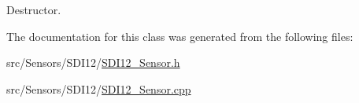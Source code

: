 Destructor. 



The documentation for this class was generated from the following files\+:\begin{DoxyCompactItemize}
\item 
src/\+Sensors/\+S\+D\+I12/\hyperlink{_s_d_i12___sensor_8h}{S\+D\+I12\+\_\+\+Sensor.\+h}\item 
src/\+Sensors/\+S\+D\+I12/\hyperlink{_s_d_i12___sensor_8cpp}{S\+D\+I12\+\_\+\+Sensor.\+cpp}\end{DoxyCompactItemize}

